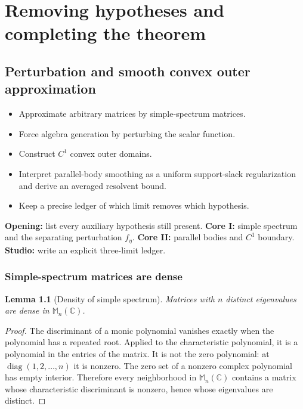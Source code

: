 \documentclass[11pt,oneside,openany]{book}
\newtheorem{lemma}[theorem]{Lemma}
\theoremstyle{definition}
\theoremstyle{remark}
\newcommand{\C}{\mathbb C}
\newcommand{\Mn}{\mathbb M_n(\C)}
\newcommand{\diag}{\operatorname{diag}}
\begin{document}
\part{Removing hypotheses and completing the theorem}

\chapter{Perturbation and smooth convex outer approximation}
\label{ch:approximation}

\begin{learninggoals}
\begin{itemize}
  \item Approximate arbitrary matrices by simple-spectrum matrices.
  \item Force algebra generation by perturbing the scalar function.
  \item Construct \(C^1\) convex outer domains.
  \item Interpret parallel-body smoothing as a uniform support-slack
  regularization and derive an averaged resolvent bound.
  \item Keep a precise ledger of which limit removes which hypothesis.
\end{itemize}
\end{learninggoals}

\begin{workshopplan}
\textbf{Opening:} list every auxiliary hypothesis still present.
\textbf{Core I:} simple spectrum and the separating perturbation
\(f_\eta\). \textbf{Core II:} parallel bodies and \(C^1\) boundary.
\textbf{Studio:} write an explicit three-limit ledger.
\end{workshopplan}

\section{Simple-spectrum matrices are dense}

\begin{lemma}[Density of simple spectrum]
\label{lem:simple-density}
Matrices with \(n\) distinct eigenvalues are dense in \(\Mn\).
\end{lemma}

\begin{proof}
The discriminant of a monic polynomial vanishes exactly when the
polynomial has a repeated root.  Applied to the characteristic
polynomial, it is a polynomial in the entries of the matrix.  It is
not the zero polynomial: at \(\diag(1,2,\ldots,n)\) it is nonzero.
The zero set of a nonzero complex polynomial has empty interior.
Therefore every neighborhood in \(\Mn\) contains a matrix whose
characteristic discriminant is nonzero, hence whose eigenvalues are
distinct.
\end{proof}
\end{document}
